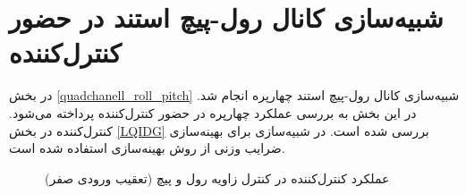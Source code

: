 \section{شبیه‌سازی کانال رول-پیچ استند در حضور کنترل‌کننده }
\label{roll_pitch_lqidg_section_simulation}
در بخش
\ref{quadchanell_roll_pitch}
شبیه‌سازی کانال رول-پیچ استند چهارپره انجام شد. در این بخش به بررسی عملکرد چهارپره در حضور کنترل‌کننده  پرداخته می‌شود. کنترل‌کننده   در بخش
\ref{LQIDG}
بررسی شده است.
 در شبیه‌سازی برای بهینه‌سازی ضرایب وزنی   از روش بهینه‌سازی
 \cite{Karimi2010}
استفاده شده است.
%	
\begin{figure}[H]
	\centering
	\caption{‫‪عملکرد کنترل‌کننده  در کنترل زاویه رول و پیچ (تعقیب ورودی صفر)}
	\label{lqidg_roll_pitch_fig_simulation}
\end{figure}



